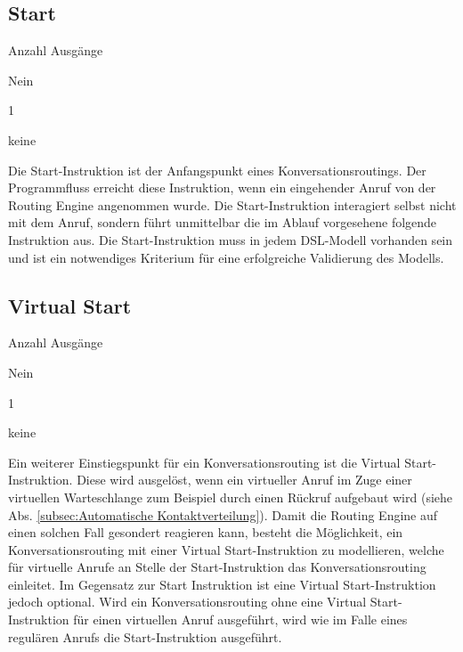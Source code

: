 \subsection{Start}
\label{subsec:start}
\begin{labeling}{Anzahl Ausgänge}
\item [Eingang] Nein
\item [Anzahl Ausgänge] 1
\item [Parameter] keine
\item [Beschreibung] Die Start-Instruktion ist der Anfangspunkt eines Konversationsroutings. Der Programmfluss erreicht diese Instruktion, wenn ein eingehender Anruf von der Routing Engine angenommen wurde. Die Start-Instruktion interagiert selbst nicht mit dem Anruf, sondern führt unmittelbar die im Ablauf vorgesehene folgende Instruktion aus. Die Start-Instruktion muss in jedem DSL-Modell vorhanden sein und ist ein notwendiges Kriterium für eine erfolgreiche Validierung des Modells. 
\end{labeling}

\subsection{Virtual Start}
\label{subsec:virtual start}
\begin{labeling}{Anzahl Ausgänge}
\item [Eingang] Nein
\item [Anzahl Ausgänge] 1
\item [Parameter] keine
\item [Beschreibung] Ein weiterer Einstiegspunkt für ein Konversationsrouting ist die Virtual Start-Instruktion. Diese wird ausgelöst, wenn ein virtueller Anruf im Zuge einer virtuellen Warteschlange zum Beispiel durch einen Rückruf aufgebaut wird (siehe Abs. \ref{subsec:Automatische Kontaktverteilung}). Damit die Routing Engine auf einen solchen Fall gesondert reagieren kann, besteht die Möglichkeit, ein Konversationsrouting mit einer Virtual Start-Instruktion zu modellieren, welche für virtuelle Anrufe an Stelle der Start-Instruktion das Konversationsrouting einleitet. Im Gegensatz zur Start Instruktion ist eine Virtual Start-Instruktion jedoch optional. Wird ein Konversationsrouting ohne eine Virtual Start-Instruktion für einen virtuellen Anruf ausgeführt, wird wie im Falle eines regulären Anrufs die Start-Instruktion ausgeführt.
\end{labeling}

